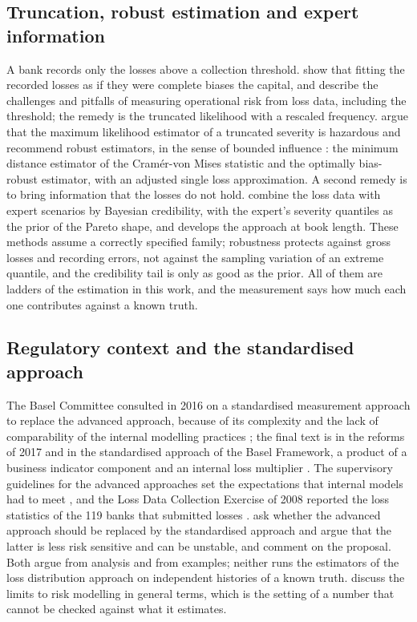 \subsection{Truncation, robust estimation and expert information}
\label{sec:rw-truncation}

A bank records only the losses above a collection threshold. \citet{mignola2007} show that fitting the recorded losses as if they were complete biases the capital, and \citet{cope2009} describe the challenges and pitfalls of measuring operational
risk from loss data, including the threshold; the remedy is the truncated likelihood with a rescaled frequency. \citet{opdyke2012} argue that the maximum likelihood estimator of a truncated severity is hazardous and recommend robust
estimators, in the sense of bounded influence \citep{hampel1986,huber2009}: the minimum distance estimator of the Cram\'er-von Mises statistic and the optimally bias-robust estimator, with an adjusted single loss approximation. A
second remedy is to bring information that the losses do not hold. \citet{shevchenko2006} combine the loss data with expert scenarios by Bayesian credibility, with the expert's severity quantiles as the prior of the Pareto shape, and \citet{shevchenko2011}
develops the approach at book length. These methods assume a correctly specified family; robustness protects against gross losses and recording errors, not against the sampling variation of an extreme quantile, and the credibility tail is only as good as the prior.
All of them are ladders of the estimation in this work, and the measurement says how much each one contributes against a known truth.

\subsection{Regulatory context and the standardised approach}
\label{sec:rw-regulatory}

The Basel Committee consulted in 2016 on a standardised measurement approach to replace the advanced approach, because of its complexity and the lack of comparability of the internal modelling practices \citep{bcbsd355}; the final text is in the
reforms of 2017 and in the standardised approach of the Basel Framework, a product of a business indicator component and an internal loss multiplier \citep{bcbsd424,ope25}. The supervisory guidelines for the advanced approaches set the expectations that internal models had to meet \citep{bcbs196},
and the Loss Data Collection Exercise of 2008 reported the loss statistics of the 119 banks that submitted losses \citep{bcbs160}. \citet{peters2016} ask whether the advanced approach should be replaced by the standardised approach and argue that the latter is less risk sensitive and can be unstable,
and \citet{mignola2016} comment on the proposal. Both argue from analysis and from examples; neither runs the estimators of the loss distribution approach on independent histories of a known truth. \citet{danielsson2002} discuss the limits to risk modelling in general terms,
which is the setting of a number that cannot be checked against what it estimates.

